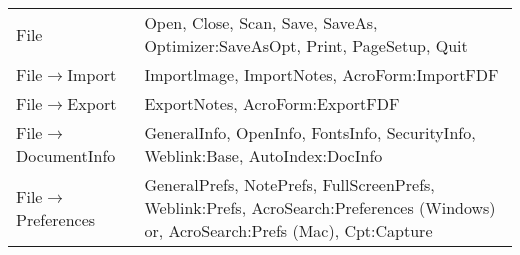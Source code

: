 \clearpage
{

\tablelasttail{}
\begin{center}
\begin{xtabular}{|p{4cm}|p{10cm}|}
\midrule
File                          & Open, Close, Scan, Save, SaveAs, Optimizer:SaveAsOpt, Print, PageSetup, Quit                                                                                                                                                                                       \\
File$\rightarrow$Import       & Importlmage, ImportNotes, AcroForm:ImportFDF                                                                                                                                                                                                                       \\
File$\rightarrow$Export       & ExportNotes, AcroForm:ExportFDF                                                                                                                                                                                                                                    \\
File$\rightarrow$DocumentInfo & GeneralInfo, OpenInfo, FontsInfo, SecurityInfo, Weblink:Base, AutoIndex:DocInfo                                                                                                                                                                                    \\
File$\rightarrow$Preferences  & GeneralPrefs, NotePrefs, FullScreenPrefs, Weblink:Prefs,     AcroSearch:Preferences (Windows) or, AcroSearch:Prefs (Mac),     Cpt:Capture                                                                                                                          \\

\end{xtabular}
\end{center}}
